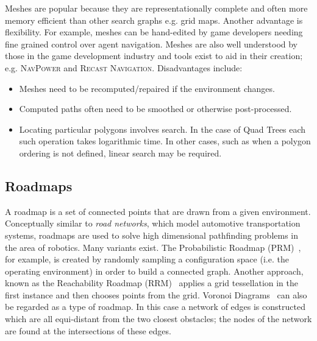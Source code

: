 Meshes are popular because they are representationally complete and often more
memory efficient than other search graphs e.g. grid maps. Another advantage is
flexibility. For example, meshes can be hand-edited by game developers needing
fine grained control over agent navigation. Meshes are also well understood by 
those in the game development industry and tools exist to aid in their creation; 
e.g. \textsc{NavPower} and \textsc{Recast Navigation}. Disadvantages include: 
\begin{itemize}
\item Meshes need to be recomputed/repaired if the environment changes.
\item Computed paths often need to be smoothed or otherwise post-processed.
\item Locating particular polygons involves search. In the case 
of Quad Trees each such operation takes logarithmic time. In other cases,
such as when a polygon ordering is not defined, linear search may be required.
\end{itemize}

\subsection{Roadmaps}
\label{cha::lit::graphs::road}
A roadmap is a set of connected points that are drawn from a given environment.
Conceptually similar to \emph{road networks}, which model automotive
transportation systems, roadmaps are used to solve high dimensional pathfinding
problems in the area of robotics.  Many variants exist. The Probabilistic
Roadmap (PRM)~\citep{kavraki94}, for example,
 is created by randomly sampling a configuration space (i.e. the operating environment) in
order to build a connected graph. Another approach, known as the Reachability
Roadmap (RRM)~\citep{geraerts05} applies a grid tessellation in the first
instance and then chooses points from the grid.  Voronoi Diagrams~\citep{aurenhammer91}
can also be regarded as a type of roadmap. In this case a network of edges is constructed
which are all equi-distant from the two closest obstacles; the nodes of the network are 
found at the intersections of these edges.

